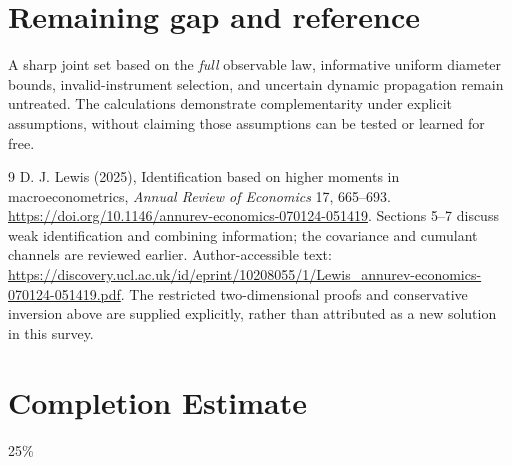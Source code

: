 \documentclass[11pt,a4paper]{article}
\theoremstyle{definition}
\theoremstyle{remark}
\begin{document}
\section{Remaining gap and reference}
A sharp joint set based on the \emph{full} observable law, informative uniform diameter bounds, invalid-instrument selection, and uncertain dynamic propagation remain untreated. The calculations demonstrate complementarity under explicit assumptions, without claiming those assumptions can be tested or learned for free.
\begin{thebibliography}{9}
 D. J. Lewis (2025), Identification based on higher moments in macroeconometrics, \emph{Annual Review of Economics} 17, 665--693. \url{https://doi.org/10.1146/annurev-economics-070124-051419}. Sections 5--7 discuss weak identification and combining information; the covariance and cumulant channels are reviewed earlier. Author-accessible text: \url{https://discovery.ucl.ac.uk/id/eprint/10208055/1/Lewis_annurev-economics-070124-051419.pdf}. The restricted two-dimensional proofs and conservative inversion above are supplied explicitly, rather than attributed as a new solution in this survey.
\end{thebibliography}

\section{Completion Estimate}
25\%
\end{document}
